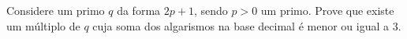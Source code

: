 Considere um primo $q$ da forma $2p + 1$, sendo $p > 0$ um primo.
Prove que existe um múltiplo de $q$ cuja soma dos algarismos na base decimal é menor ou igual a $3$.